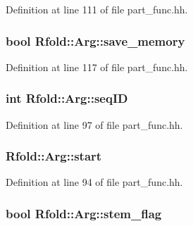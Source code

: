 Definition at line 111 of file part\+\_\+func.\+hh.

\hypertarget{class_rfold_1_1_arg_a4baebf9ebff2c466c56e5e377cccd360}{
\subsubsection[{save\+\_\+memory}]{\setlength{\rightskip}{0pt plus 5cm}bool Rfold\+::\+Arg\+::save\+\_\+memory}}\label{class_rfold_1_1_arg_a4baebf9ebff2c466c56e5e377cccd360}


Definition at line 117 of file part\+\_\+func.\+hh.

\hypertarget{class_rfold_1_1_arg_a7e5e99f9fa61d2b7fe2d03d212f075d3}{
\subsubsection[{seq\+I\+D}]{\setlength{\rightskip}{0pt plus 5cm}int Rfold\+::\+Arg\+::seq\+I\+D}}\label{class_rfold_1_1_arg_a7e5e99f9fa61d2b7fe2d03d212f075d3}


Definition at line 97 of file part\+\_\+func.\+hh.

\hypertarget{class_rfold_1_1_arg_afe6c58f953e12b4964a7c14b78ee731e}{
\subsubsection[{start}]{ Rfold\+::\+Arg\+::start}}\label{class_rfold_1_1_arg_afe6c58f953e12b4964a7c14b78ee731e}


Definition at line 94 of file part\+\_\+func.\+hh.

\hypertarget{class_rfold_1_1_arg_aa67a67820097b91b6376581ae28ee481}{
\subsubsection[{stem\+\_\+flag}]{\setlength{\rightskip}{0pt plus 5cm}bool Rfold\+::\+Arg\+::stem\+\_\+flag}}\label{class_rfold_1_1_arg_aa67a67820097b91b6376581ae28ee481}


